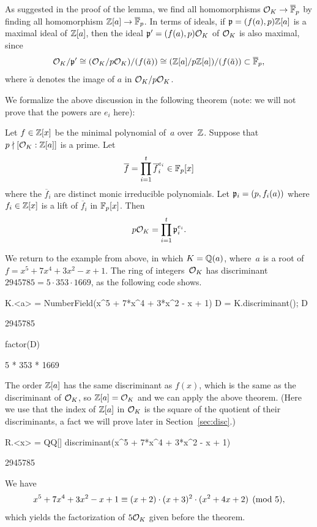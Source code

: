 As suggested in the proof of the lemma, we find all homomorphisms
$\mathcal{O}_K\to \overline{\mathbb{F}}_p$ by finding all homomorphism $\mathbb{Z}[a]\to \overline{\mathbb{F}}_p$.  In
terms of ideals, if $\mathfrak{p}=(f(a),p)\mathbb{Z}[a]$ is a maximal ideal of $\mathbb{Z}[a]$,
then the ideal $\mathfrak{p}'=(f(a),p)\mathcal{O}_K$ of $\mathcal{O}_K$ is also maximal, since
$$\mathcal{O}_K/\mathfrak{p}'\cong (\mathcal{O}_K/p\mathcal{O}_K)/(f(\tilde{a}))
\cong (\mathbb{Z}[a]/p\mathbb{Z}[a]) / (f(\tilde{a})) \subset \overline{\mathbb{F}}_p,$$
where $\tilde{a}$ denotes the image of $a$ in $\mathcal{O}_K/p\mathcal{O}_K$.

We formalize the above discussion in the following theorem (note: we will
not prove that the powers are $e_i$ here):
\begin{theorem}\label{thm:fac1}
Let $f\in\mathbb{Z}[x]$ be the minimal polynomial of~$a$ over~$\mathbb{Z}$.
Suppose that~$p\nmid [\mathcal{O}_K:\mathbb{Z}[a]]$ is a prime.
Let
$$
 \overline{f} = \prod_{i=1}^t \overline{f}_i^{e_i} \in \mathbb{F}_p[x]
$$
where the $\overline{f}_i$ are distinct monic irreducible
polynomials.
Let
$
  \mathfrak{p}_i = (p,f_i(a))
$
where $f_i\in\mathbb{Z}[x]$ is a lift of $\overline{f}_i$ in $\mathbb{F}_p[x]$.
Then
$$
  p\mathcal{O}_K = \prod_{i=1}^t \mathfrak{p}_i^{e_i}.
$$
\end{theorem}

We return to the example from above, in which $K=\mathbb{Q}(a)$, where~$a$ is
a root of $f = x^5+7x^4+3x^2-x+1$.  The ring
of integers~$\mathcal{O}_K$ has discriminant $2945785 = 5\cdot 353\cdot 1669$,
as the following \sage code shows.
\begin{sagecode}
\begin{sagecell}
K.<a> = NumberField(x^5 + 7*x^4 + 3*x^2 - x + 1)
D = K.discriminant(); D
\end{sagecell}
\begin{sageout}
2945785
\end{sageout}
\begin{sagecell}
factor(D)
\end{sagecell}
\begin{sageout}
5 * 353 * 1669
\end{sageout}
\end{sagecode}
The order $\mathbb{Z}[a]$ has the same discriminant as $f(x)$, which
is the same as the discriminant of $\mathcal{O}_K$, so
$\mathbb{Z}[a]=\mathcal{O}_K$ and we can apply the above theorem.
(Here we use that the index of $\mathbb{Z}[a]$ in $\mathcal{O}_K$
is the square of the quotient of their discriminants,
a fact we will prove later in Section~\ref{sec:disc}.)
\begin{sagecode}
\begin{sagecell}
R.<x> = QQ[]
discriminant(x^5 + 7*x^4 + 3*x^2 - x + 1)
\end{sagecell}
\begin{sageout}
2945785
\end{sageout}
\end{sagecode}
We have
$$
  x^5+7x^4+3x^2-x+1 \equiv (x+2)\cdot (x+3)^2 \cdot (x^2+4x+2)\pmod{5},
$$
which yields the factorization of $5\mathcal{O}_K$ given before the theorem.

